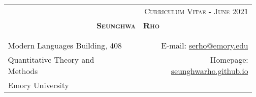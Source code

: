 \documentclass[10pt]{article}
\begin{document}
\begin{center}
\begin{tabular}{lr}
& \textsc{Curriculum Vitae - June 2021} \\
\multicolumn{2}{c}{{\Large \textsc{\textbf{Seunghwa \ Rho }}}}\\ 
\multicolumn{2}{p{510pt}}{}\\
\hline\\
Modern Languages Building, 408   & E-mail: \href{mailto:serho@emory.edu}{serho@emory.edu} \\
\multicolumn{1}{l}{Quantitative Theory and Methods}& Homepage: \href{https://seunghwarho.github.io}{seunghwarho.github.io}\\
\multicolumn{2}{l}{Emory University}\\
\end{tabular}


\end{center}
\end{document}
